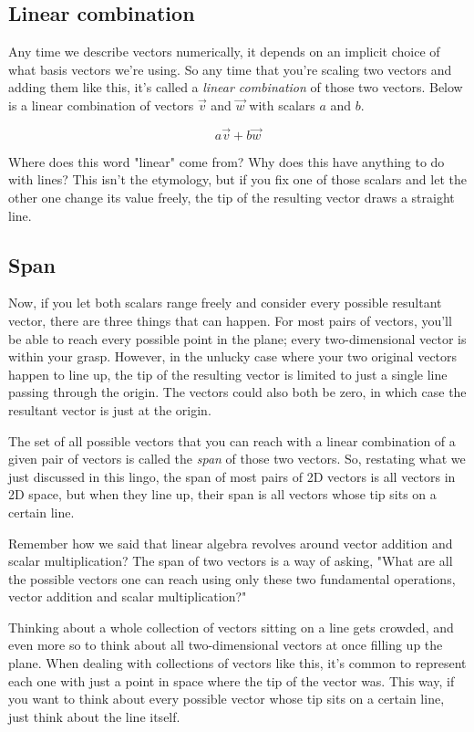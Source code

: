 \subsection{Linear combination}

Any time we describe vectors numerically, it depends on an implicit choice of
what basis vectors we're using. So any time that you're scaling two vectors and
adding them like this, it's called a \textit{linear combination} of those two
vectors. Below is a linear combination of vectors $\vec{v}$ and $\vec{w}$ with
scalars $a$ and $b$.

\begin{equation*}
  a \vec{v} + b \vec{w}
\end{equation*}

Where does this word "linear" come from? Why does this have anything to do with
lines? This isn't the etymology, but if you fix one of those scalars and let the
other one change its value freely, the tip of the resulting vector draws a
straight line.

\subsection{Span}

Now, if you let both scalars range freely and consider every possible resultant
vector, there are three things that can happen. For most pairs of vectors,
you'll be able to reach every possible point in the plane; every two-dimensional
vector is within your grasp. However, in the unlucky case where your two original
vectors happen to line up, the tip of the resulting vector is limited to just a
single line passing through the origin. The vectors could also both be zero, in
which case the resultant vector is just at the origin.

The set of all possible vectors that you can reach with a linear combination of
a given pair of vectors is called the \textit{span} of those two vectors. So,
restating what we just discussed in this lingo, the span of most pairs of 2D
vectors is all vectors in 2D space, but when they line up, their span is all
vectors whose tip sits on a certain line.

Remember how we said that linear algebra revolves around vector addition and
scalar multiplication? The span of two vectors is a way of asking, "What are all
the possible vectors one can reach using only these two fundamental operations,
vector addition and scalar multiplication?"

Thinking about a whole collection of vectors sitting on a line gets crowded, and
even more so to think about all two-dimensional vectors at once filling up the
plane. When dealing with collections of vectors like this, it's common to
represent each one with just a point in space where the tip of the vector was.
This way, if you want to think about every possible vector whose tip sits on a
certain line, just think about the line itself.

